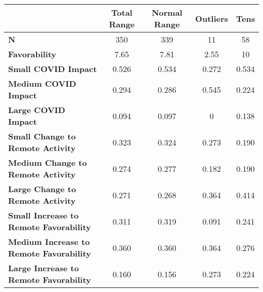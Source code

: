 {
\def\sym#1{\ifmmode^{#1}\else\(^{#1}\)\fi}
\begin{tabular}{lcccc}
    \toprule
                                                    & \textbf{Total Range} & \textbf{Normal Range} & \textbf{Outliers} & \textbf{Tens} \\
    \midrule
    \textbf{N}                                      & 350                  & 339                   & 11                & 58            \\
    \textbf{Favorability}                           & 7.65                 & 7.81                  & 2.55              & 10            \\
    \textbf{Small COVID Impact}                     & 0.526                & 0.534                 & 0.272             & 0.534         \\
    \textbf{Medium COVID Impact}                    & 0.294                & 0.286                 & 0.545             & 0.224         \\
    \textbf{Large COVID Impact}                     & 0.094                & 0.097                 & 0                 & 0.138         \\
    \textbf{Small Change to Remote Activity}        & 0.323                & 0.324                 & 0.273             & 0.190         \\
    \textbf{Medium Change to Remote Activity}       & 0.274                & 0.277                 & 0.182             & 0.190         \\
    \textbf{Large Change to Remote Activity}        & 0.271                & 0.268                 & 0.364             & 0.414         \\
    \textbf{Small Increase to Remote Favorability}  & 0.311                & 0.319                 & 0.091             & 0.241         \\
    \textbf{Medium Increase to Remote Favorability} & 0.360                & 0.360                 & 0.364             & 0.276         \\
    \textbf{Large Increase to Remote Favorability}  & 0.160                & 0.156                 & 0.273             & 0.224         \\
    \bottomrule
\end{tabular}
}
